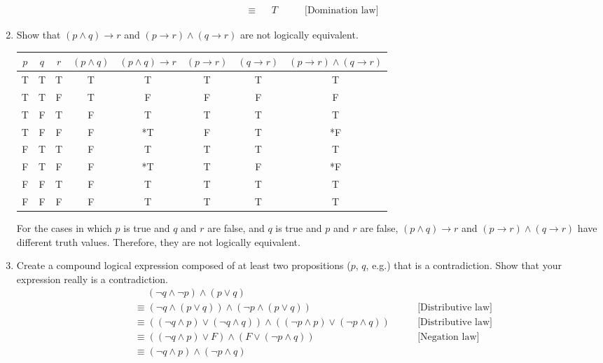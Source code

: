 \documentclass[letterpaper, 12pt]{article}
\newcommand{\then}{\rightarrow}
\begin{document}
\begin{enumerate}
\begin{align*}
    &\equiv & &T \qquad
    &\text{[Domination law]}
\end{align*}
\pagebreak
\item Show that $(p \wedge q) \then r$ and $(p \then r) \wedge (q \then r)$ are not logically equivalent.
\begin{center}
    \begin{tabular}{c | c | c | c | c | c | c | c}
        $p$ & $q$ & $r$ & $(p \wedge q)$ & $(p \wedge q) \then r$ & $(p \then r)$ & $(q \then r)$ 
        & $(p \then r) \wedge (q \then r)$ \\
        \hline
        T & T & T & T & T & T & T & T\\
        T & T & F & T & F & F & F & F\\
        T & F & T & F & T & T & T & T\\
        T & F & F & F & *T & F & T & *F\\
        F & T & T & F & T & T & T & T\\
        F & T & F & F & *T & T & F & *F\\
        F & F & T & F & T & T & T & T\\
        F & F & F & F & T & T & T & T\\
    \end{tabular}
\end{center}
\begin{flushleft}
    For the cases in which $p$ is true and $q$ and $r$ are false, and $q$ is true and $p$ and 
    $r$ are false, $(p \wedge q) \then r$ and $(p \then r) \wedge (q \then r)$ have different 
    truth values. Therefore, they are not logically equivalent.
\end{flushleft}
\item Create a compound logical expression composed of at least two propositions ($p$, $q$, e.g.) 
that is a contradiction. Show that your expression really is a contradiction.
\begin{align*}
    &\quad \; (\neg q \wedge \neg p) \wedge (p \vee q) \\
    &\equiv (\neg q \wedge (p \vee q)) \wedge (\neg p \wedge (p \vee q)) \qquad
    &\text{[Distributive law]} \\
    &\equiv ((\neg q \wedge p) \vee (\neg q \wedge q)) \wedge ((\neg p \wedge p) \vee (\neg p \wedge q)) \qquad
    &\text{[Distributive law]} \\
    &\equiv ((\neg q \wedge p) \vee F) \wedge (F \vee (\neg p \wedge q)) \qquad
    &\text{[Negation law]} \\
    &\equiv (\neg q \wedge p) \wedge (\neg p \wedge q) \qquad

\end{align*}
\end{enumerate}
\end{document}
